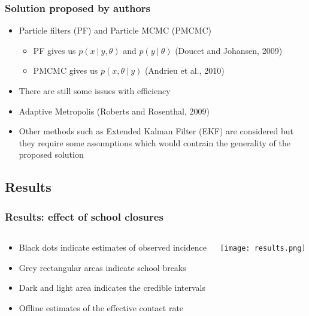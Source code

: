 \documentclass{beamer}
\begin{document}
\begin{frame}
    \frametitle{Solution proposed by authors}
    \begin{itemize}
        \item Particle filters (PF) and Particle MCMC (PMCMC)
            \begin{itemize}
                \item PF gives us $p(x\:|\:y,\theta)$ and $p(y\:|\:\theta)$ (Doucet and Johansen, 2009)
                \item PMCMC gives us $p(x,\theta\:|\:y)$ (Andrieu et al., 2010)
            \end{itemize}
        \item There are still some issues with efficiency
        \item Adaptive Metropolis (Roberts and Rosenthal, 2009)
        \item Other methods such as Extended Kalman Filter (EKF) are considered but they require some assumptions which would contrain the generality of the proposed solution
    \end{itemize}
\end{frame}

\subsection{Results}

\begin{frame}
    \frametitle{Results: effect of school closures}
    \begin{columns}
    \begin{column}{0.5\textwidth}
    \begin{itemize}
        \small
        \item Black dots indicate estimates of observed incidence
        \item Grey rectangular areas indicate school breaks
        \item Dark and light area indicates the credible intervals
        \item Offline estimates of the effective contact rate
    \end{itemize}
    \end{column}
    \begin{column}{0.5\textwidth}
    \texttt{[image: results.png]}
    \end{column}
    \end{columns}
\end{frame}
\end{document}
